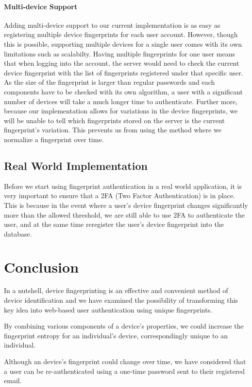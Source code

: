\documentclass{acm_proc_article-sp}
\begin{document}
\paragraph{Multi-device Support}
Adding multi-device support to our current implementation is as easy as registering multiple device fingerprints for each user account. However, though this is possible, supporting multiple devices for a single user comes with its own limitations such as scalabilty. Having multiple fingerprints for one user means that when logging into the account, the server would need to check the current device fingerprint with the list of fingerprints registered under that specific user. As the size of the fingerprint is larger than regular passwords and each components have to be checked with its own algorithm, a user with a significant number of devices will take a much longer time to authenticate. Further more, because our implementation allows for  variations in the device fingerprints, we will be unable to tell which fingerprints stored on the server is the current fingerprint's variation. This prevents us from using the method where we normalize a fingerprint over time.

\subsection{Real World Implementation}
Before we start using fingerprint authentication in a real world application, it is very important to ensure that a 2FA (Two Factor Authentication) is in place. This is because in the event where a user's device fingerprint changes significantly more than the allowed threshold, we are still able to use 2FA to authenticate the user, and at the same time reregister the user's device fingerprint into the database.

\section{Conclusion}
In a nutshell, device fingerprinting is an effective and convenient method of device identification and we have examined the possibility of transforming this key idea into web-based user authentication using unique fingerprints.

By combining various components of a device's properties, we could increase the fingerprint entropy for an individual's device, correspondingly unique to an individual.

Although an device's fingerprint could change over time, we have considered that a user can be re-authenticated using a one-time password sent to their registered email.
\end{document}
